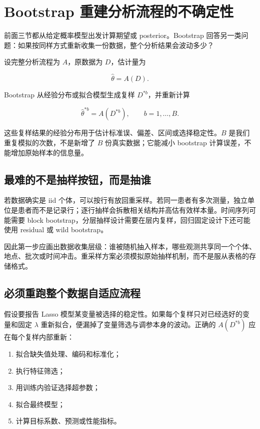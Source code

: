\section{Bootstrap 重建分析流程的不确定性}

前面三节都从给定概率模型出发计算期望或 posterior。Bootstrap 回答另一类问题：如果按同样方式重新收集一份数据，整个分析结果会波动多少？

设完整分析流程为 \(A\)，原数据为 \(D\)，估计量为

\[
\widehat\theta=A(D).
\]

Bootstrap 从经验分布或拟合模型生成复样 \(D^{*b}\)，并重新计算

\[
\widehat\theta^{*b}=A(D^{*b}),
\qquad b=1,\ldots,B.
\]

这些复样结果的经验分布用于估计标准误、偏差、区间或选择稳定性。\(B\) 是我们重复模拟的次数，不是新增了 \(B\) 份真实数据；它能减小 bootstrap 计算误差，不能增加原始样本的信息量。

\subsection{最难的不是抽样按钮，而是抽谁}

若数据确实是 iid 个体，可以按行有放回重采样。若同一患者有多次测量，独立单位是患者而不是记录行；逐行抽样会拆散相关结构并高估有效样本量。时间序列可能需要 block bootstrap，分层抽样设计需要在层内复样，回归固定设计下还可能使用 residual 或 wild bootstrap。

因此第一步应画出数据收集层级：谁被随机抽入样本，哪些观测共享同一个个体、地点、批次或时间冲击。重采样方案必须模拟原始抽样机制，而不是服从表格的存储格式。

\subsection{必须重跑整个数据自适应流程}

假设要报告 Lasso 模型某变量被选择的稳定性。如果每个复样只对已经选好的变量和固定 \(\lambda\) 重新拟合，便漏掉了变量筛选与调参本身的波动。正确的 \(A(D^{*b})\) 应在每个复样内部重新：

\begin{enumerate}
\def\labelenumi{\arabic{enumi}.}
\tightlist
\item
  拟合缺失值处理、编码和标准化；
\item
  执行特征筛选；
\item
  用训练内验证选择超参数；
\item
  拟合最终模型；
\item
  计算目标系数、预测或性能指标。
\end{enumerate}

